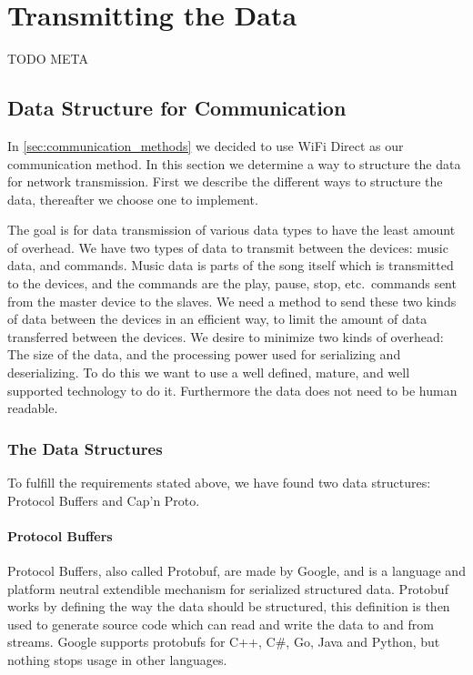 \section{Transmitting the Data}\label{sec:transmitting_the_data}
TODO META

\subsection{Data Structure for Communication}\label{sec:transmit}
In \cref{sec:communication_methods} we decided to use WiFi Direct as our communication method.
In this section we determine a way to structure the data for network transmission. 
First we describe the different ways to structure the data, thereafter we choose one to implement.

\bigskip
The goal is for data transmission of various data types to have the least amount of overhead.
We have two types of data to transmit between the devices: music data, and commands.
Music data is parts of the song itself which is transmitted to the devices,
and the commands are the play, pause, stop, etc.\ commands sent from the master device to the slaves.
We need a method to send these two kinds of data between the devices in an efficient way,
to limit the amount of data transferred between the devices.
We desire to minimize two kinds of overhead: The size of the data, and the processing power used for serializing and deserializing.
To do this we want to use a well defined, mature, and well supported technology to do it.
Furthermore the data does not need to be human readable.

\subsubsection{The Data Structures}
To fulfill the requirements stated above, we have found two data structures: Protocol Buffers and Cap'n Proto. 

\paragraph{Protocol Buffers}
Protocol Buffers, also called Protobuf, are made by Google, and is a language and platform neutral extendible mechanism for serialized structured data.
Protobuf works by defining the way the data should be structured, this definition is then used to generate source code which can read and write the data to and from streams.\cite{protobuf}
Google supports protobufs for C++, C\#, Go, Java and Python, but nothing stops usage in other languages\cite{protobuf}.

